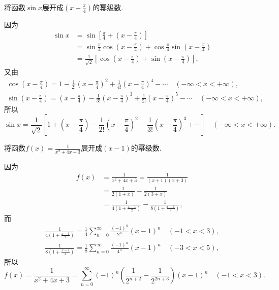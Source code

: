\begin{example}
将函数\(\sin x\)展开成\(\left(x-\frac{\pi}{4}\right)\)的幂级数.
\begin{solution}
因为\begin{align*}
	\sin x &= \sin\left[\frac{\pi}{4}+\left(x-\frac{\pi}{4}\right)\right] \\
	&= \sin\frac{\pi}{4} \cos\left(x-\frac{\pi}{4}\right) + \cos\frac{\pi}{4} \sin\left(x-\frac{\pi}{4}\right) \\
	&= \frac{1}{\sqrt{2}} \left[\cos\left(x-\frac{\pi}{4}\right) + \sin\left(x-\frac{\pi}{4}\right)\right],
\end{align*}
又由\begin{gather*}
	\cos\left(x-\frac{\pi}{4}\right)
	= 1 - \frac{1}{2!} \left(x-\frac{\pi}{4}\right)^2 + \frac{1}{4!} \left(x-\frac{\pi}{4}\right)^4 - \dotsb
	\quad(-\infty < x < +\infty), \\
	\sin\left(x-\frac{\pi}{4}\right)
	= \left(x-\frac{\pi}{4}\right) - \frac{1}{3!} \left(x-\frac{\pi}{4}\right)^3 + \frac{1}{5!} \left(x-\frac{\pi}{4}\right)^5 - \dotsb
	\quad(-\infty < x < +\infty),
\end{gather*}
所以\[
	\sin x = \frac{1}{\sqrt{2}} \left[
	1 + \left(x-\frac{\pi}{4}\right)
	- \frac{1}{2!} \left(x-\frac{\pi}{4}\right)^2
	- \frac{1}{3!} \left(x-\frac{\pi}{4}\right)^3
	+ \dotsb
	\right]
	\quad(-\infty < x < +\infty).
\]
\end{solution}
\end{example}

\begin{example}
将函数\(f(x) = \frac{1}{x^2+4x+3}\)展开成\((x-1)\)的幂级数.
\begin{solution}
因为\begin{align*}
	f(x) &= \frac{1}{x^2+4x+3}
	= \frac{1}{(x+1)(x+3)} \\
	&= \frac{1}{2(1+x)} - \frac{1}{2(3+x)} \\
	&= \frac{1}{4\left(1+\frac{x-1}{2}\right)}
	- \frac{1}{8\left(1+\frac{x-1}{4}\right)},
\end{align*}
而\begin{gather*}
	\frac{1}{4\left(1+\frac{x-1}{2}\right)}
	= \frac{1}{4} \sum_{n=0}^\infty \frac{(-1)^n}{2^n} (x-1)^n
	\quad(-1<x<3), \\
	\frac{1}{8\left(1+\frac{x-1}{4}\right)}
	= \frac{1}{8} \sum_{n=0}^\infty \frac{(-1)^n}{4^n} (x-1)^n
	\quad(-3<x<5),
\end{gather*}
所以\[
	f(x) = \frac{1}{x^2+4x+3}
	= \sum_{n=0}^\infty (-1)^n \left(\frac{1}{2^{n+2}}-\frac{1}{2^{2n+3}}\right) (x-1)^n
	\quad(-1<x<3).
\]
\end{solution}
\end{example}

